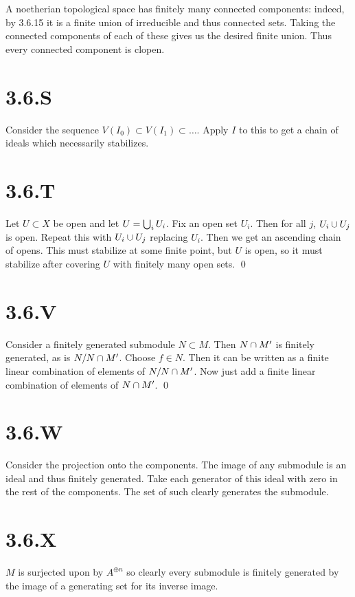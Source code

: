 \documentclass{article}
\begin{document}
A noetherian topological space has finitely many connected components: indeed,
by 3.6.15 it is a finite union of irreducible and thus connected sets. Taking
the connected components of each of these gives us the desired finite union.
Thus every connected component is clopen.

\section{3.6.S}
Consider the sequence $V(I_0) \subset V(I_1) \subset \dots$. Apply $I$ to
this to get a chain of ideals which necessarily stabilizes.

\section{3.6.T}
Let $U \subset X$ be open and let $U=\bigcup_i U_i$. Fix an
open set $U_i$. Then for all $j$,
$U_i \cup U_j$ is open. Repeat this with $U_i \cup U_j$
replacing $U_i$. Then we get an ascending chain of opens.
This must stabilize at some finite point, but $U$ is open,
so it must stabilize after covering $U$ with finitely many
open sets. \qed

\section{3.6.V}
Consider a finitely generated submodule $N \subset M$. Then
$N \cap M'$ is finitely generated, as is $N/N \cap M'$.
Choose $f \in N$. Then it can be written as a finite linear
combination of elements of $N/N \cap M'$. Now just add a finite
linear combination of elements of $N \cap M'$. \qed

\section{3.6.W}
Consider the projection onto the components. The image of any submodule is an
ideal and thus finitely generated. Take each generator of this ideal with zero
in the rest of the components. The set of such clearly generates the submodule.

\section{3.6.X}
$M$ is surjected upon by $A^{\oplus n}$ so clearly
every submodule is finitely generated by the image of a generating set for its
inverse image.
\end{document}
